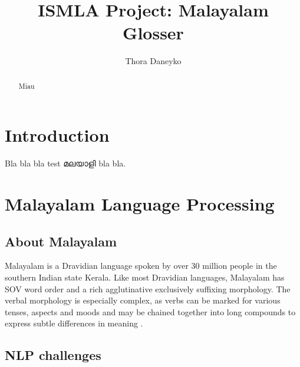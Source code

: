 \documentclass[a4paper]{article}
\author{Thora Daneyko}
\title{ISMLA Project: Malayalam Glosser}
\begin{document}
\maketitle

\begin{abstract}
Miau
\end{abstract}


\section{Introduction}

Bla bla bla test മലയാളി bla bla.

\section{Malayalam Language Processing}

\subsection{About Malayalam}

Malayalam is a Dravidian language spoken by over 30 million people in the southern Indian state Kerala. Like most Dravidian languages, Malayalam has SOV word order and a rich agglutinative exclusively suffixing morphology. The verbal morphology is especially complex, as verbs can be marked for various tenses, aspects and moods and may be chained together into long compounds to express subtle differences in meaning \parencite{asherKumari}.

\subsection{NLP challenges}
\end{document}
